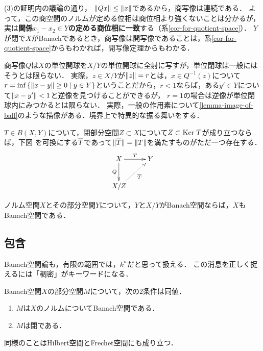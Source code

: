 \documentclass[uplatex,dvipdfmx]{jsreport}
\begin{document}
\begin{remark}
    (3)の証明内の議論の通り，
    $\|Qx\|\le\|x\|$であるから，商写像は連続である．
    よって，この商空間のノルムが定める位相は商位相より強くないことは分かるが，実は\textbf{関係$x_1-x_2\in Y$の定める商位相に一致}する（系\ref{cor-for-quotient-space}）．
    $Y$が閉で$X$がBanachであるとき，商写像は開写像であることは，系\ref{cor-for-quotient-space}からもわかれば，開写像定理からもわかる．
\end{remark}
\begin{remark}[連続延長の失敗]
    商写像$Q$は$X$の単位開球を$X/Y$の単位開球に全射に写すが，単位閉球は一般にはそうとは限らない．
    実際，$z\in X/Y$が$\|z\|=r$とは，$x\in Q^{-1}(z)$について$r=\inf\left\{\|x-y\|\ge 0\mid y\in Y\right\}$ということだから，$r<1$ならば，ある$y'\in Y$について$\|x-y'\|<1$と逆像を見つけることができるが，
    $r=1$の場合は逆像が単位閉球内にみつかるとは限らない．
    実際，一般の作用素について\ref{lemma-image-of-ball}のような描像がある．境界上で特異的な振る舞いをする．
\end{remark}

\begin{proposition}[商空間の普遍性]
    $T\in B(X,Y)$について，閉部分空間$Z\subset X$について$Z\subset\mathrm{Ker}\; T$が成り立つならば，下図
    を可換にする$\overline{T}$であって$\|\overline{T}\|=\|T\|$を満たすものがただ一つ存在する．
    \[\xymatrix{
        X\ar[r]^-T\ar[d]_-Q&Y\\
        X/Z\ar@{.>}[ur]_-{\o{T}}
    }\]
\end{proposition}

\begin{proposition}[Banach空間の標準分解]
    ノルム空間$X$とその部分空間$Y$について，$Y$と$X/Y$がBanach空間ならば，$X$もBanach空間である．
\end{proposition}

\subsection{包含}

\begin{tcolorbox}[colframe=ForestGreen, colback=ForestGreen!10!white,breakable,colbacktitle=ForestGreen!40!white,coltitle=black,fonttitle=\bfseries\sffamily,
title=連続線形延長の算譜]
    Banach空間論も，有限の範囲では，$k^n$だと思って扱える．
    この消息を正しく捉えるには「稠密」がキーワードになる．
\end{tcolorbox}

\begin{proposition}[部分空間]
    Banach空間$X$の部分空間$M$について，次の2条件は同値．
    \begin{enumerate}
        \item $M$は$X$のノルムについてBanach空間である．
        \item $M$は閉である．
    \end{enumerate}
\end{proposition}
\begin{remark}
    同様のことはHilbert空間とFrechet空間にも成り立つ．
\end{remark}
\end{document}
